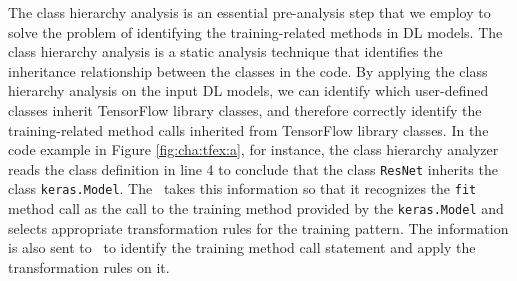 The class hierarchy analysis is an essential pre-analysis step that we employ
to solve the problem of identifying the training-related methods in DL models.
The class hierarchy analysis is a static analysis technique that identifies the
inheritance relationship between the classes in the code. 
By applying the class hierarchy analysis on the input DL models, we can
identify which user-defined classes inherit TensorFlow library classes, and
therefore correctly identify the training-related method calls inherited from
TensorFlow library classes.
In the code example in Figure \ref{fig:cha:tfex:a}, for instance, the class
hierarchy analyzer reads the class definition in line 4 to conclude that the
class {\tt ResNet} inherits the class {\tt keras.Model}. 
The \tapi~takes this information so that it recognizes the {\tt fit} method
call as the call to the training method provided by the {\tt keras.Model} and
selects appropriate transformation rules for the training pattern.
The information is also sent to \atran~to identify the training method call
statement and apply the transformation rules on it.


